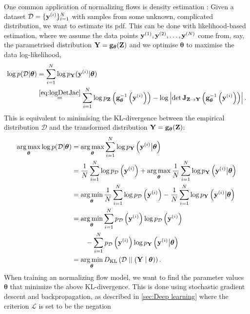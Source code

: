 \documentclass{statsmsc}
\begin{document}
{One common application of normalizing flows is density estimation \citep{normalizing_flows}:
Given a dataset $\mathcal{D}=\{\mathbf{y}^{(i)}\}_{i=1}^N$ with samples from some
unknown, complicated distribution, we want to estimate its \ac{pdf}.
This can be done with likelihood-based estimation, where we assume the data points
$\mathbf{y}^{(1)}, \mathbf{y}^{(2)},\dots,\mathbf{y}^{(N)}$ come from, say,
the parametrised distribution $\mathbf{Y}=\mathbf{g}_{\bm \theta}(\mathbf{Z})$ and
we optimise $\bm\theta$ to maximise the data log-likelihood,
\begin{align}
    \log p(\mathcal{D}| \bm\theta)
    & = \sum_{i=1}^N \log p_\bfY(\bfy^{(i)}| \bm\theta ) \\
    &\stackrel{\cref{eq:logDetJac}}{=} \sum^{N}_{i=1}
    \log p_\bfZ\left(\mathbf{g}_{\bm\theta}^{-1}\left(\bfy^{(i)}\right)\right) - \log \left|\det \mathbf{J}_{\bfZ \rightarrow {\bfY}}\left(\mathbf{g}_{\bm\theta}^{-1}\left(\bfy^{(i)}\right)\right) \right|. \label{eq:logProbKL}
\end{align}
This is equivalent to minimising the \ac{KL-divergence} between the empirical distribution
$\mathcal{D}$ and the transformed distribution $\mathbf{Y}=\mathbf{g}_{\bm\theta}(\mathbf{Z})$:
\begin{align}
    \operatorname*{arg\,max}_{\bm\theta} \log p(\mathcal{D}| \bm\theta)
    &= \operatorname*{arg\,max}_{\bm\theta}\sum_{i=1}^N \log p_{\mathbf{Y}} \left(\mathbf{y}^{(i)}\big|\bm\theta \right) \\
    &=\frac{1}{N}  \sum_{i=1}^N \log p_{\mathcal{D}}\left(\mathbf{y}^{(i)}\right)
        +\operatorname*{arg\,max}_{\bm\theta}\frac{1}{N} \sum_{i=1}^N \log p_{\mathbf{Y}} \left(\mathbf{y}^{(i)}\big|\bm\theta \right) \\
    &= \operatorname*{arg\,min}_{\bm\theta}\frac{1}{N}  \sum_{i=1}^N \log p_{\mathcal{D}}\left(\mathbf{y}^{(i)}\right)
    -\frac{1}{N} \sum_{i=1}^N \log p_{\mathbf{Y}} \left(\mathbf{y}^{(i)}\big|\bm\theta \right) \\
    &= \operatorname*{arg\,min}_{\bm\theta}\sum^{N}_{i=1}  p_\mathcal{D}\left(\mathbf{y}^{(i)}\right)  \log p_{\mathcal{D}}\left(\mathbf{y}^{(i)}\right) \\
    &\qquad- \sum_{i=1}^N  p_\mathcal{D}\left(\mathbf{y}^{(i)}\right) \log p_{\mathbf{Y}} \left(\mathbf{y}^{(i)}\big|\bm\theta \right) \\
    &= \operatorname*{arg\,min}_{\bm\theta} D_{\textrm{KL}}\left(\mathcal{D}\;||\; (\mathbf{Y}\mid\bm\theta)\right).
\end{align}
When training an normalizing flow model, we want to find the parameter values
$\bm\theta$ that minimize the above \ac{KL-divergence}.
This is done using stochastic gradient descent and backpropagation, as described in
\cref{sec:Deep learning} where the criterion $\mathcal{L}$ is set to be the negation
}
\end{document}
